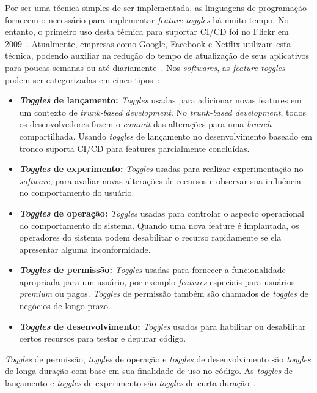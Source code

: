 \documentclass[portugues]{ic-tese}
\begin{document}
Por ser uma técnica simples de ser implementada, as linguagens de programação fornecem o necessário para implementar \textit{feature toggles} há muito tempo. No entanto, o primeiro uso desta técnica para suportar CI/CD foi no Flickr em 2009~\citep{Mahdavi-hezaveh_2021}. Atualmente, empresas como Google, Facebook e Netflix utilizam esta técnica, podendo auxiliar na redução do tempo de atualização de seus aplicativos para poucas semanas ou até diariamente~\citep{Rahman_2016}. Nos \textit{softwares}, as \textit{feature toggles} podem ser categorizadas em cinco tipos~\citep{Mahdavi-hezaveh_2021}:

\begin{itemize}
\item \textbf{\textit{Toggles} de lançamento:} \textit{Toggles} usadas para adicionar novas features em um contexto de \textit{trunk-based development}. No \textit{trunk-based development}, todos os desenvolvedores fazem o \textit{commit} das alterações para uma \textit{branch} compartilhada. Usando \textit{toggles} de lançamento no desenvolvimento baseado em tronco suporta CI/CD para features parcialmente concluídas.
\item \textbf{\textit{Toggles} de experimento:} \textit{Toggles} usadas para realizar experimentação no \textit{software}, para avaliar novas alterações de recursos e observar sua influência no comportamento do usuário.
\item \textbf{\textit{Toggles} de operação:} \textit{Toggles} usadas para controlar o aspecto operacional do comportamento do sistema. Quando uma nova feature é implantada, os operadores do sistema podem desabilitar o recurso rapidamente se ela apresentar alguma inconformidade.
\item \textbf{\textit{Toggles} de permissão:} \textit{Toggles} usadas para fornecer a funcionalidade apropriada para um usuário, por exemplo \textit{features} especiais para usuários \textit{premium} ou pagos. \textit{Toggles} de permissão também são chamados de \textit{toggles} de negócios de longo prazo.
\item \textbf{\textit{Toggles} de desenvolvimento:} \textit{Toggles} usados para habilitar ou desabilitar certos recursos para testar e depurar código.
\end{itemize}

\textit{Toggles} de permissão, \textit{toggles} de operação e \textit{toggles} de desenvolvimento são \textit{toggles} de longa duração com base em sua finalidade de uso no código. As \textit{toggles} de lançamento e \textit{toggles} de experimento são \textit{toggles} de curta duração~\citep{Mahdavi-hezaveh_2021}.
\end{document}
